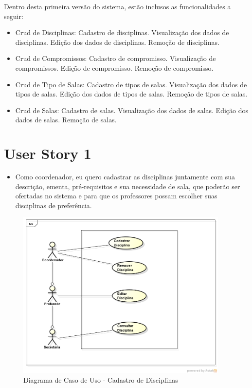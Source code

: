 \documentclass{abnt}
\begin{document}
		Dentro desta primeira versão do sistema, estão inclusos as funcionalidades a seguir:
			\begin{itemize}
			\item Crud de Disciplinas:
			\subitem Cadastro de disciplinas.
			\subitem Visualização dos dados de disciplinas.
			\subitem Edição dos dados de disciplinas.
			\subitem Remoção de disciplinas.
			
			\item Crud de Compromissos:
			\subitem Cadastro de compromisso.
			\subitem Visualização de compromissos.
			\subitem Edição de compromisso.
			\subitem Remoção de compromisso.
			
			\item Crud de Tipo de Salas:
			\subitem Cadastro de tipos de salas.
			\subitem Visualização dos dados de tipos de salas.
			\subitem Edição dos dados de tipos de salas.
			\subitem Remoção de tipos de salas.
			
			\item Crud de Salas:
			\subitem Cadastro de salas.
			\subitem Visualização dos dados de salas.
			\subitem Edição dos dados de salas.
			\subitem Remoção de salas.

			\end{itemize}

	\clearpage
	\section{User Story 1}
	
		\begin{itemize}
			\item Como coordenador, eu quero cadastrar as disciplinas juntamente com sua descrição, ementa, pré-requisitos e sua necessidade de sala, que poderão ser ofertadas no sistema e para que os professores possam escolher suas disciplinas de preferência.
		\end{itemize}
				
		\begin{figure}[h]
			\begin{center}
				 \includegraphics[width=400px]{casoUsoDisciplinas}
				 \caption{Diagrama de Caso de Uso - Cadastro de Disciplinas}
				 \label{fig:casoUsoCadastroDisciplina}
			\end{center}
		\end{figure}
		\FloatBarrier
	
\end{document}
